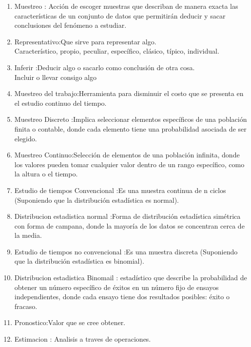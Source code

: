 \begin{enumerate}
    \item Muestreo : Acción de escoger muestras que describan de manera exacta las características de un conjunto de datos que permitirán deducir y sacar conclusiones del fenómeno a estudiar.
    
    \item Representativo:Que sirve para representar algo.
    \\ {Característico, propio, peculiar, específico, clásico, típico, individual.}
    
    \item Inferir :Deducir algo o sacarlo como conclusión de otra cosa.
       \\Incluir o llevar consigo algo
       
    \item Muestreo del trabajo:Herramienta para disminuir el costo que se presenta en el estudio continuo del tiempo.
    
    \item Muestreo Discreto :Implica seleccionar elementos específicos de una población finita o contable, donde cada elemento tiene una probabilidad asociada de ser elegido.
    
    \item Muestreo Continuo:Selección de elementos de una población infinita, donde los valores pueden tomar cualquier valor dentro de un rango específico, como la altura o el tiempo.

    \item Estudio de tiempos Convencional :Es una muestra continua de n ciclos (Suponiendo que la distribución estadística es normal).
    
    \item Distribucion estadistica normal :Forma de distribución estadística simétrica con forma de campana, donde la mayoría de los datos se concentran cerca de la media.

    \item Estudio de tiempos no convencional :Es una muestra discreta (Suponiendo que la distribución estadística es binomial).
    
    \item Distribucion estadistica Binomail : estadístico que describe la probabilidad de obtener un número específico de éxitos en un número fijo de ensayos independientes, donde cada ensayo tiene dos resultados posibles: éxito o fracaso.

    \item Pronostico:Valor que se cree obtener.
    
    \item Estimacion : Analisis a traves de operaciones.

\end{enumerate}


